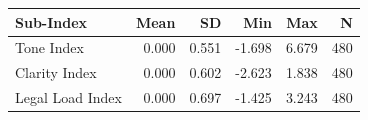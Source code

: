 \begin{tabular}{lrrrrr}
\toprule
Sub-Index & Mean & SD & Min & Max & N \\
\midrule
Tone Index & 0.000 & 0.551 & -1.698 & 6.679 & 480 \\
Clarity Index & 0.000 & 0.602 & -2.623 & 1.838 & 480 \\
Legal Load Index & 0.000 & 0.697 & -1.425 & 3.243 & 480 \\
\bottomrule
\end{tabular}
